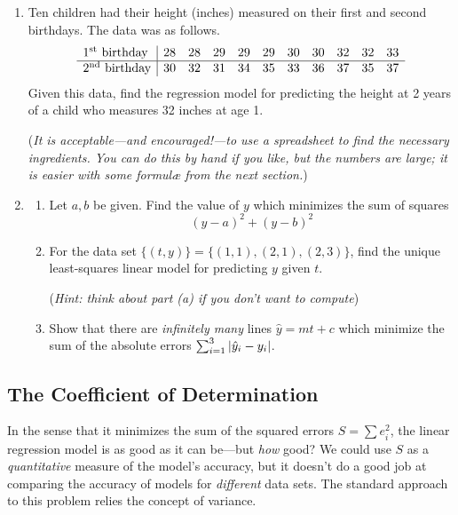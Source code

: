 \begin{exercises}{}{}
\begin{enumerate}
	  
	  \item Ten children had their height (inches) measured on their first and second birthdays. The data was as follows.
	  \[
	  	\begin{array}{l|cccccccccc}
	  		\text{1\textsuperscript{st}{} birthday}&28&28&29&29&29&30&30&32&32&33\\\hline
	  		\text{2\textsuperscript{nd}{} birthday}&30&32&31&34&35&33&36&37&35&37
	  	\end{array}
	  \]
	  Given this data, find the regression model for predicting the height at 2 years of a child who measures 32 inches at age 1. %
	  \par
	  (\emph{It is acceptable---and encouraged!---to use a spreadsheet to find the necessary ingredients. You can do this by hand if you like, but the numbers are large; it is easier with some formulæ from the next section.})
	  
	  \item\begin{enumerate}
	    \item Let $a,b$ be given. Find the value of $y$ which minimizes the sum of squares
	    \[
	    	(y-a)^2+(y-b)^2
	    \]
	    \item For the data set $\bigl\{(t,y)\bigr\} =\bigl\{(1,1),(2,1),(2,3)\bigr\}$, find the unique least-squares linear model for predicting $y$ given $t$.\par
	    (\emph{Hint: think about part (a) if you don't want to compute})
	    \item	Show that there are \emph{infinitely many} lines $\hat y=mt+c$ which minimize the sum of the absolute errors $\sum_{i=1}^3\left| \hat y_i-y_i\right|$.
	  \end{enumerate}
	\end{enumerate}
\end{exercises}




\clearpage


\subsection{The Coefficient of Determination}

In the sense that it minimizes the sum of the squared errors $S=\sum e_i^2$, the linear regression model is as good as it can be---but \emph{how} good? We could use $S$ as a \emph{quantitative} measure of the model's accuracy, but it doesn't do a good job at comparing the accuracy of models for \emph{different} data sets. The standard approach to this problem relies the concept of variance.

